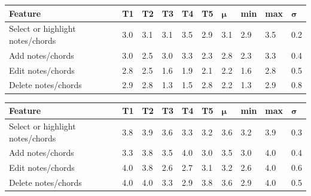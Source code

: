 		\begin{table}[!htpb]
		  \centering
		   \label{tab:common-samples-it1}
		  \begin{tabular}{|p{3cm}|R{.7cm}|R{.7cm}|R{.7cm}|R{.7cm}|R{.7cm}|R{.8cm}|R{.8cm}|R{.8cm}|R{.8cm}|}
		  	\hline
		  	\textbf{Feature} & \textbf{T1} & \textbf{T2} & \textbf{T3} & \textbf{T4} & \textbf{T5} & \begin{math}\bm{\mu}\end{math} & \textbf{min} & \textbf{max} & \begin{math}\bm{\sigma}\end{math} \\ \hline

		  	Select or highlight notes/chords 	& 3.0 & 3.1 & 3.1 & 3.5 & 2.9 & 3.1 & 2.9 & 3.5 & 0.2 \\ \hline
			Add notes/chords 						& 3.0 & 2.5 & 3.0 & 3.3 & 2.3 & 2.8 & 2.3 & 3.3 & 0.4 \\ \hline
			Edit notes/chords 						& 2.8 & 2.5 & 1.6 & 1.9 & 2.1 & 2.2 & 1.6 & 2.8 & 0.5 \\ \hline
			Delete notes/chords 					& 2.9 & 2.8 & 1.3 & 1.5 & 2.8 & 2.2 & 1.3 & 2.9 & 0.8 \\ \hline
			

		  \end{tabular}
		\end{table}

		\begin{table}[!htpb]
		  \centering
		   \label{tab:common-samples-it2}
		  \begin{tabular}{|p{3cm}|R{.7cm}|R{.7cm}|R{.7cm}|R{.7cm}|R{.7cm}|R{.8cm}|R{.8cm}|R{.8cm}|R{.8cm}|}
		  	\hline
		  	\textbf{Feature} & \textbf{T1} & \textbf{T2} & \textbf{T3} & \textbf{T4} & \textbf{T5} & \begin{math}\bm{\mu}\end{math} & \textbf{min} & \textbf{max} & \begin{math}\bm{\sigma}\end{math} \\ \hline

		  	Select or highlight notes/chords 	& 3.8 & 3.9 & 3.6 & 3.3 & 3.2 & 3.6 & 3.2 & 3.9 & 0.3 \\ \hline
			Add notes/chords 						& 3.3 & 3.8 & 3.5 & 4.0 & 3.0 & 3.5 & 3.0 & 4.0 & 0.4 \\ \hline
			Edit notes/chords 						& 4.0 & 3.8 & 2.6 & 2.7 & 3.1 & 3.2 & 2.6 & 4.0 & 0.6 \\ \hline
			Delete notes/chords 					& 4.0 & 4.0 & 3.3 & 2.9 & 3.8 & 3.6 & 2.9 & 4.0 & 0.5 \\ \hline
			

		  \end{tabular}
		\end{table}

